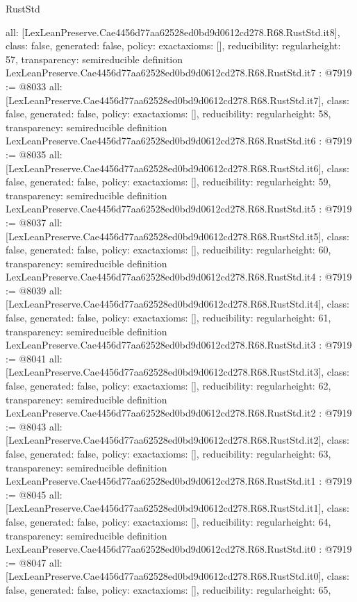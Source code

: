 \begin{lexlean}{RustStd}
\begin{coremodule}
{  all: [LexLeanPreserve.Cae4456d77aa62528ed0bd9d0612cd278.R68.RustStd.it8],
  class: false,
  generated: false,
  policy: exact{axioms: []},
  reducibility: regular{height: 57},
  transparency: semireducible
}
definition LexLeanPreserve.Cae4456d77aa62528ed0bd9d0612cd278.R68.RustStd.it7 : @7919 := @8033 {
  all: [LexLeanPreserve.Cae4456d77aa62528ed0bd9d0612cd278.R68.RustStd.it7],
  class: false,
  generated: false,
  policy: exact{axioms: []},
  reducibility: regular{height: 58},
  transparency: semireducible
}
definition LexLeanPreserve.Cae4456d77aa62528ed0bd9d0612cd278.R68.RustStd.it6 : @7919 := @8035 {
  all: [LexLeanPreserve.Cae4456d77aa62528ed0bd9d0612cd278.R68.RustStd.it6],
  class: false,
  generated: false,
  policy: exact{axioms: []},
  reducibility: regular{height: 59},
  transparency: semireducible
}
definition LexLeanPreserve.Cae4456d77aa62528ed0bd9d0612cd278.R68.RustStd.it5 : @7919 := @8037 {
  all: [LexLeanPreserve.Cae4456d77aa62528ed0bd9d0612cd278.R68.RustStd.it5],
  class: false,
  generated: false,
  policy: exact{axioms: []},
  reducibility: regular{height: 60},
  transparency: semireducible
}
definition LexLeanPreserve.Cae4456d77aa62528ed0bd9d0612cd278.R68.RustStd.it4 : @7919 := @8039 {
  all: [LexLeanPreserve.Cae4456d77aa62528ed0bd9d0612cd278.R68.RustStd.it4],
  class: false,
  generated: false,
  policy: exact{axioms: []},
  reducibility: regular{height: 61},
  transparency: semireducible
}
definition LexLeanPreserve.Cae4456d77aa62528ed0bd9d0612cd278.R68.RustStd.it3 : @7919 := @8041 {
  all: [LexLeanPreserve.Cae4456d77aa62528ed0bd9d0612cd278.R68.RustStd.it3],
  class: false,
  generated: false,
  policy: exact{axioms: []},
  reducibility: regular{height: 62},
  transparency: semireducible
}
definition LexLeanPreserve.Cae4456d77aa62528ed0bd9d0612cd278.R68.RustStd.it2 : @7919 := @8043 {
  all: [LexLeanPreserve.Cae4456d77aa62528ed0bd9d0612cd278.R68.RustStd.it2],
  class: false,
  generated: false,
  policy: exact{axioms: []},
  reducibility: regular{height: 63},
  transparency: semireducible
}
definition LexLeanPreserve.Cae4456d77aa62528ed0bd9d0612cd278.R68.RustStd.it1 : @7919 := @8045 {
  all: [LexLeanPreserve.Cae4456d77aa62528ed0bd9d0612cd278.R68.RustStd.it1],
  class: false,
  generated: false,
  policy: exact{axioms: []},
  reducibility: regular{height: 64},
  transparency: semireducible
}
definition LexLeanPreserve.Cae4456d77aa62528ed0bd9d0612cd278.R68.RustStd.it0 : @7919 := @8047 {
  all: [LexLeanPreserve.Cae4456d77aa62528ed0bd9d0612cd278.R68.RustStd.it0],
  class: false,
  generated: false,
  policy: exact{axioms: []},
  reducibility: regular{height: 65},
}
\end{coremodule}
\end{lexlean}
